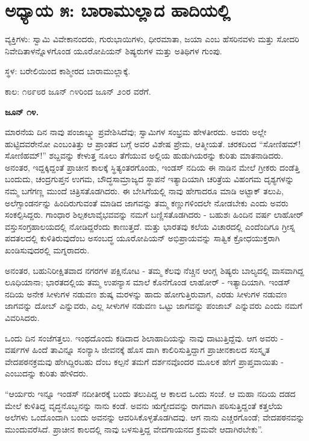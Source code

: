 
\chapter{ಅಧ್ಯಾಯ ೫: ಬಾರಾಮುಲ್ಲಾದ ಹಾದಿಯಲ್ಲಿ}

ವ್ಯಕ್ತಿಗಳು: ಸ್ವಾಮಿ ವಿವೇಕಾನಂದರು, ಗುರುಭಾಯಿಗಳು, ಧೀರಮಾತಾ, ಜಯಾ ಎಂಬ ಹೆಸರಿನವಳು ಮತ್ತು ಸೋದರಿ ನಿವೇದಿತಾಳನ್ನೊಳಗೊಂಡ ಯೂರೋಪಿಯನ್ ಶಿಷ್ಯರುಗಳ ಮತ್ತು ಅತಿಥಿಗಳ ಗುಂಪು.

ಸ್ಥಳ: ಬರೇಲಿಯಿಂದ ಕಾಶ್ಮೀರದ ಬಾರಾಮುಲ್ಲಾಕ್ಕೆ.

ಕಾಲ: ೧೮೯೮ರ ಜೂನ್ ೧೪ರಿಂದ ಜೂನ್ ೨೦ರ ವರೆಗೆ.

\textbf{ಜೂನ್ ೧೪.}

ಮಾರನೆಯ ದಿನ ನಾವು ಪಂಜಾಬ್ನ್ನು ಪ್ರವೇಶಿಸಿದೆವು; ಸ್ವಾಮಿಗಳ ಸಂಭ್ರಮ ಹೇಳತೀರದು. ಅವರು ಅಲ್ಲೇ ಹುಟ್ಟಿದವರೇನೋ ಎಂಬಂತಿತ್ತು ಆ ಪ್ರಾಂತದ ಬಗ್ಗೆ ಅವರ ವಿಶೇಷ ಪ್ರೇಮ, ಆತ್ಮೀಯತೆ. ಚರಕದಿಂದ “ಸೋಣಿಹಮ್​! ಸೋಣಿಹಮ್​!” ಶಬ್ದವನ್ನು ಕೇಳುತ್ತ ನೂಲು ತೆಗೆಯುವ ಅಲ್ಲಿಯ ಹುಡುಗಿಯರನ್ನು ಕುರಿತು ಮಾತನಾಡಿದರು. ಅನಂತರ, ಇದ್ದಕ್ಕಿದ್ದಂತೆ ಪ್ರಾಚೀನ ಕಾಲಕ್ಕೆ ಸ್ಥಿತ್ಯಂತರಗೊಂಡು, ಇಂಡಸ್ ನದಿಯ ಈ ನಾಡಿನ ಮೇಲೆ ಗ್ರೀಕರು ದಂಡೆತ್ತಿ ಬಂದುದು, ಚಂದ್ರಗುಪ್ತನ ಉಗಮ, ಬೌದ್ಧಸಾಮ್ರಾಜ್ಯದ ಸ್ಥಾಪನೆ ಇತ್ಯಾದಿಯಾಗಿ ಚರಿತ್ರೆಯ ವಿಹಂಗಮ ದೃಶ್ಯಗಳನ್ನು ನಮ್ಮ ಬಗೆಗಣ್ಣ ಮುಂದೆ ಚಿತ್ರಿಸತೊಡಗಿದರು. ಈ ಬೇಸಿಗೆಯಲ್ಲಿ ನಾವು ಹೇಗಾದರೂ ಮಾಡಿ ಅಟ್ಟಾಕ್ ತಲುಪಿ, ಅಲೆಗ್ಸಾಂಡರ್ನನ್ನು ಹಿಂದಿರುಗುವಂತೆ ಮಾಡಿದ ಜಾಗವನ್ನು ತಮ್ಮ ಕಣ್ಣುಗಳಿಂದಲೇ ನೋಡಬೇಕು ಎಂದು ಅವರು ಸಂಕಲ್ಪಿಸಿದ್ದರು. ಗಾಂಧಾರ ಶಿಲ್ಪಕಲಾವೈಭವವನ್ನು ನಮಗೆ ಬಣ್ಣಿಸತೊಡಗಿದರು - ಬಹುಶಃ ಹಿಂದಿನ ವರ್ಷ ಲಾಹೋರ್ ವಸ್ತುಸಂಗ್ರಹಾಲಯದಲ್ಲಿ ನೋಡಿದ್ದರೆಂದು ಕಾಣುತ್ತದೆ. ಮತ್ತು ಭಾರತವು ಕಲೆಯ ವಿಚಾರದಲ್ಲಿ ಎಂದೆಂದಿಗೂ ಗ್ರೀಸ್ನ ಪದತಲದಲ್ಲಿ ಕುಳಿತಿರುವುದೆಂಬ ಅಸಂಬದ್ಧ ಯೂರೋಪಿಯನ್ ಅಭಿಪ್ರಾಯವನ್ನು ಸಾತ್ವಿಕ ಕ್ರೋಧಯುಕ್ತರಾಗಿ ಖಂಡಿಸುವುದರಲ್ಲಿ ಮಗ್ನರಾದರು.

ಅನಂತರ, ಬಹುನಿರೀಕ್ಷಿತವಾದ ನಗರಗಳ ಪಕ್ಷಿನೋಟ - ತಮ್ಮ ಕೆಲವು ನೆಚ್ಚಿನ ಆಂಗ್ಲ ಶಿಷ್ಯರು ಬಾಲ್ಯದಲ್ಲಿ ವಾಸವಾಗಿದ್ದ ಲೂಧಿಯಾನಾ; ಭಾರತದಲ್ಲಿಯ ತಮ್ಮ ಉಪನ್ಯಾಸ ಮಾಲೆ ಕೊನೆಗೊಂಡ ಲಾಹೋರ್ - ಇತ್ಯಾದಿಯಾಗಿ. ಇಂಡಸ್ ನದಿಯ ಅನೇಕ ಸೀಳುಗಳ ನಡುವಣ ಶುಷ್ಕ ಮರಳನ್ನು ಹಾದು ಹೋಗುತ್ತಿರುವಾಗ, ಎರಡು ಸೀಳುಗಳ ನಡುವಣ ಜಾಗವನ್ನು ದೋಬ್ ಎನ್ನುವರು, ಎಲ್ಲ ಸೀಳುಗಳ ನಡುವಣ ಒಟ್ಟು ಜಾಗವನ್ನು ಪಂಜಾಬ್ ಎನ್ನುವರು ಎಂದು ನಮಗೆ ವಿವರಿಸಿದರು.

ಒಂದು ದಿನ ಸಂಜೆಗತ್ತಲು. ಇಂಥದೊಂದು ಕಡಿದಾದ ಶಿಲಾಹಾದಿಯನ್ನು ನಾವು ದಾಟುತ್ತಿದ್ದೆವು. ಆಗ ಅವರು - ವರ್ಷಗಳ ಹಿಂದೆ ತಾವಿನ್ನೂ ಸಂನ್ಯಾಸಿ ಜೀವನಕ್ಕೆ ಹೊಸ ದಾಗಿ ಕಾಲಿರಿಸುತ್ತಿದ್ದಾಗ ಪ್ರಾಚೀನಕಾಲದ ಸಂಸ್ಕೃತ ವೇದಪಠನಕ್ರಮವು ಹೇಗಿದ್ದಿರಬಹು ದೆಂಬ ಕಲ್ಪನೆ ತಮಗೆ ದರ್ಶನವೊಂದರ ಮೂಲಕ ಹೇಗೆ ಪ್ರಾಪ್ತವಾಯಿತು - ಎಂಬುದನ್ನು ಕುರಿತು ಹೇಳಿದರು.

“ಆರ್ಯರು ಇನ್ನೂ ಇಂಡಸ್ ನದೀತೀರಕ್ಕೆ ಬಂದು ತಲುಪಿದ್ದ ಆ ಕಾಲದ ಒಂದು ಸಂಜೆ. ಆ ಮಹಾ ನದಿಯ ದಡದ ಮೇಲೆ ಕುಳಿತಿದ್ದ ವೃದ್ಧನೊಬ್ಬನನ್ನು ನಾನು ಕಂಡೆ. ಅವನು ಋಗ್ವೇದವನ್ನು ರಾಗವಾಗಿ ಪಠಿಸುತ್ತಿದ್ದಂತೆ ಕತ್ತಲೆಯ ಅಲೆಗಳು ಒಂದೊಂದಾಗಿ ಬಂದು ಅವನನ್ನು ಆವರಿಸಿಕೊಳ್ಳತೊಡಗಿದವು. ಆಗ ನಾನು ಎಚ್ಚರಗೊಂಡೆ; ವೇದಪಠನವನ್ನು ಮುಂದುವರೆಸಿದೆ. ಪ್ರಾಚೀನ ಕಾಲದಲ್ಲಿ ನಾವು ಬಳಸುತ್ತಿದ್ದ ವೇದಗಾಯನದ ಕ್ರಮವೇ ಆದಾಗಿರಬೇಕು”.

